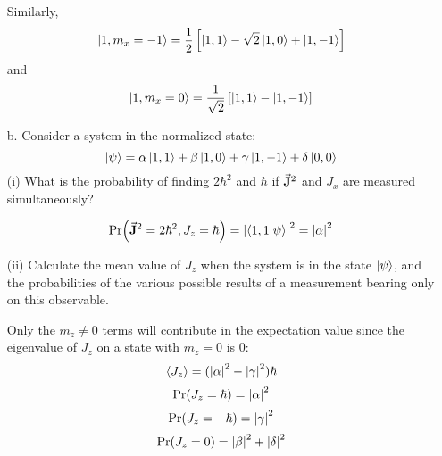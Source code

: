 \documentclass[a4paper,twoside]{article}
\begin{document}
\begin{itemize}
\begin{problem}
            Similarly,
            \begin{equation}
                \ket{1, m_x = -1} = \frac{1}{2} \left[\ket{1,1} - \sqrt{2}\ket{1,0} +\ket{1,-1} \right]
            \end{equation}
            and
            \begin{equation}
                \ket{1, m_x = 0} = \frac{1}{\sqrt{2}} \left[\ket{1,1} -\ket{1,-1} \right]
            \end{equation}
        \end{problem}
    \item[b.] Consider a system in the normalized state:
        \begin{equation}
            \ket{\psi} = \alpha\ket{1,1} + \beta\ket{1,0} + \gamma\ket{1,-1} + \delta\ket{0,0}
        \end{equation}
        \subitem(i) What is the probability of finding $ 2 \hbar^2 $ and $ \hbar $ if $ \va{J}^2 $ and $ J_x $ are measured simultaneously?
        \begin{problem}
            \begin{equation}
                \Pr( \va{J}^2 = 2 \hbar^2, J_z = \hbar) = \abs{\bra{1,1}\ket{\psi}}^2 = \abs{\alpha}^2
            \end{equation}
        \end{problem}
        \subitem(ii) Calculate the mean value of $ J_z $ when the system is in the state $\ket{\psi} $, and the probabilities of the various possible results of a measurement bearing only on this observable.
        \begin{problem}
            Only the $ m_z \neq 0 $ terms will contribute in the expectation value since the eigenvalue of $ J_z $ on a state with $ m_z = 0 $ is $ 0 $: 
            \begin{equation}
                \ev{ J_z} = (\abs{\alpha}^2 - \abs{\gamma}^2) \hbar
            \end{equation}
            \begin{equation}
                \Pr(J_z = \hbar) = \abs{\alpha}^2
            \end{equation}
            \begin{equation}
                \Pr(J_z = - \hbar) = \abs{\gamma}^2
            \end{equation}
            \begin{equation}
                \Pr(J_z = 0) = \abs{\beta}^2 + \abs{\delta}^2
            \end{equation}
        \end{problem}

\end{itemize}
\end{document}
